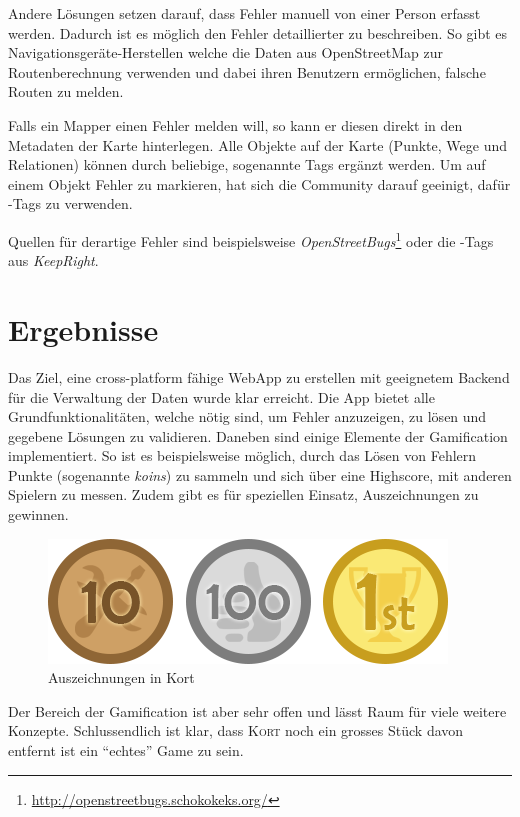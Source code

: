 Andere Lösungen setzen darauf, dass Fehler manuell von einer Person erfasst werden. Dadurch ist es möglich den Fehler detaillierter zu beschreiben. 
So gibt es Navigationsgeräte-Herstellen welche die Daten aus \gls{OpenStreetMap} zur Routenberechnung verwenden und dabei ihren Benutzern ermöglichen, falsche Routen zu melden.

Falls ein \gls{Mapper} einen Fehler melden will, so kann er diesen direkt in den Metadaten der Karte hinterlegen. Alle Objekte auf der Karte (Punkte, Wege und Relationen) können durch beliebige, sogenannte  \glspl{Tag} ergänzt werden.
Um auf einem Objekt Fehler zu markieren, hat sich die Community darauf geeinigt, dafür -\glspl{Tag} zu verwenden.

Quellen für derartige Fehler sind beispielsweise \emph{OpenStreetBugs}\footnote{\url{http://openstreetbugs.schokokeks.org/}} oder die -\glspl{Tag} aus \emph{KeepRight}.

\section*{Ergebnisse}
Das Ziel, eine cross-platform fähige \gls{WebApp} zu erstellen mit geeignetem Backend für die Verwaltung der Daten wurde klar erreicht.
Die App bietet alle Grundfunktionalitäten, welche nötig sind, um Fehler anzuzeigen, zu lösen und gegebene Lösungen zu validieren.
Daneben sind einige Elemente der \gls{Gamification} implementiert. So ist es beispielsweise möglich, durch das Lösen von Fehlern Punkte (sogenannte \emph{koins}) zu sammeln und sich über eine Highscore, mit anderen Spielern zu messen.
Zudem gibt es für speziellen Einsatz, Auszeichnungen zu gewinnen.

\begin{figure}[H]
	\centering
	\includegraphics[scale=0.6]{images/gamification/gamification-badges}
	\caption{Auszeichnungen in Kort}
	\label{image-kort-badges}
\end{figure}

Der Bereich der \gls{Gamification} ist aber sehr offen und lässt Raum für viele weitere Konzepte. Schlussendlich ist klar, dass \textsc{Kort} noch ein grosses Stück davon entfernt ist ein "`echtes"' Game zu sein.

